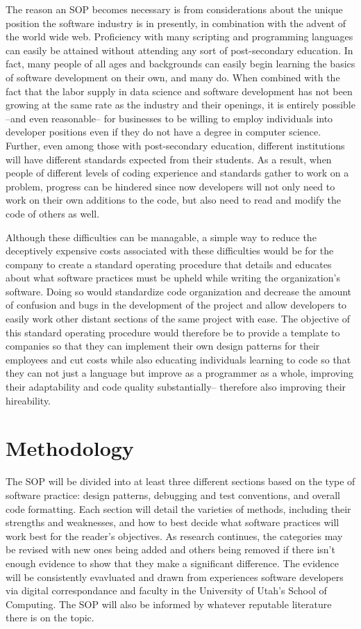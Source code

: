 \documentclass[12pt, letterpaper]{article}
\begin{document}
  The reason an SOP becomes necessary is from considerations about the unique position the software industry is in presently, in combination with the advent of the world wide web. Proficiency with many
  scripting and programming languages can easily be attained without attending any sort of post-secondary education. In fact, many people of all ages and backgrounds can easily begin learning the
  basics of software development on their own, and many do. When combined with the fact that the labor supply in data science and software development has not been growing at the same rate as the industry
  and their openings, it is entirely possible --and even reasonable-- for businesses to be willing to employ individuals into developer positions even if they do not have a degree in computer science. Further, even among
  those with post-secondary education, different institutions will have different standards expected from their students. As a result, when people of different levels of coding experience and standards
  gather to work on a problem, progress can be hindered since now developers will not only need to work on their own additions to the code, but also need to read and modify the code of others as well.

  Although these difficulties can be managable, a simple way to reduce the deceptively expensive costs associated with these difficulties would be for the company to create a standard operating
  procedure that details and educates about what software practices must be upheld while writing the organization's software. Doing so would standardize code organization and decrease the amount of
  confusion and bugs in the development of the project and allow developers to easily work other distant sections of the same project with ease. The objective of this standard operating procedure
  would therefore be to provide a template to companies so that they can implement their own design patterns for their employees and cut costs while also educating individuals learning to code
  so that they can not just a language but improve as a programmer as a whole, improving their adaptability and code quality substantially-- therefore also improving their hireability.
\section{Methodology}
  The SOP will be divided into at least three different sections based on the type of software practice: design patterns, debugging and test conventions, and overall code formatting.
  Each section will detail the varieties of methods, including their strengths and weaknesses, and how to best decide what software practices will work best for the reader's objectives. As research continues,
  the categories may be revised with new ones being added and others being removed if there isn't enough evidence to show that they make a significant difference. The evidence will be consistently evavluated and drawn from experiences software developers via digital correspondance and faculty in the University of Utah's School of Computing. The SOP will also
  be informed by whatever reputable literature there is on the topic.
\end{document}
